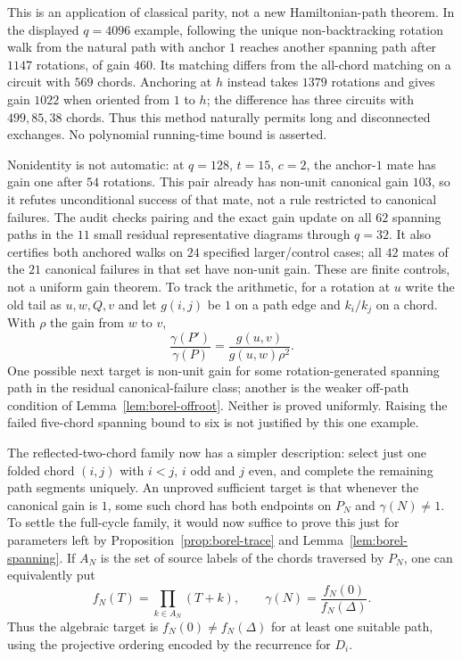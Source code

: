 \documentclass[11pt,a4paper]{article}
\theoremstyle{definition}
\theoremstyle{remark}
\begin{document}
This is an application of classical parity, not a new Hamiltonian-path theorem.  In the displayed $q=4096$ example, following the unique non-backtracking rotation walk from the natural path with anchor $1$ reaches another spanning path after $1147$ rotations, of gain $460$.  Its matching differs from the all-chord matching on a circuit with $569$ chords.  Anchoring at $h$ instead takes $1379$ rotations and gives gain $1022$ when oriented from $1$ to $h$; the difference has three circuits with $499,85,38$ chords.  Thus this method naturally permits long and disconnected exchanges.  No polynomial running-time bound is asserted.

Nonidentity is not automatic: at $q=128$, $t=15$, $c=2$, the anchor-$1$ mate has gain one after $54$ rotations.  This pair already has non-unit canonical gain $103$, so it refutes unconditional success of that mate, not a rule restricted to canonical failures.  The audit  checks pairing and the exact gain update on all $62$ spanning paths in the $11$ small residual representative diagrams through $q=32$.  It also certifies both anchored walks on $24$ specified larger/control cases; all $42$ mates of the $21$ canonical failures in that set have non-unit gain.  These are finite controls, not a uniform gain theorem.  To track the arithmetic, for a rotation at $u$ write the old tail as $u,w,Q,v$ and let $g(i,j)$ be $1$ on a path edge and $k_i/k_j$ on a chord.  With $\rho$ the gain from $w$ to $v$,
\[
              \frac{\gamma(P')}{\gamma(P)}
                  =\frac{g(u,v)}{g(u,w)\rho^2}.
\]
One possible next target is non-unit gain for some rotation-generated spanning path in the residual canonical-failure class; another is the weaker off-path condition of Lemma~\ref{lem:borel-offroot}.  Neither is proved uniformly.  Raising the failed five-chord spanning bound to six is not justified by this one example.

The reflected-two-chord family now has a simpler description: select just one folded chord $(i,j)$ with $i<j$, $i$ odd and $j$ even, and complete the remaining path segments uniquely.  An unproved sufficient target is that whenever the canonical gain is $1$, some such chord has both endpoints on $P_N$ and $\gamma(N)\ne1$.  To settle the full-cycle family, it would now suffice to prove this just for parameters left by Proposition~\ref{prop:borel-trace} and Lemma~\ref{lem:borel-spanning}.  If $A_N$ is the set of source labels of the chords traversed by $P_N$, one can equivalently put
\[
 f_N(T)=\prod_{k\in A_N}(T+k),\qquad
 \gamma(N)=\frac{f_N(0)}{f_N(\Delta)}.
\]
Thus the algebraic target is $f_N(0)\ne f_N(\Delta)$ for at least one suitable path, using the projective ordering encoded by the recurrence for $D_i$.
\end{document}
